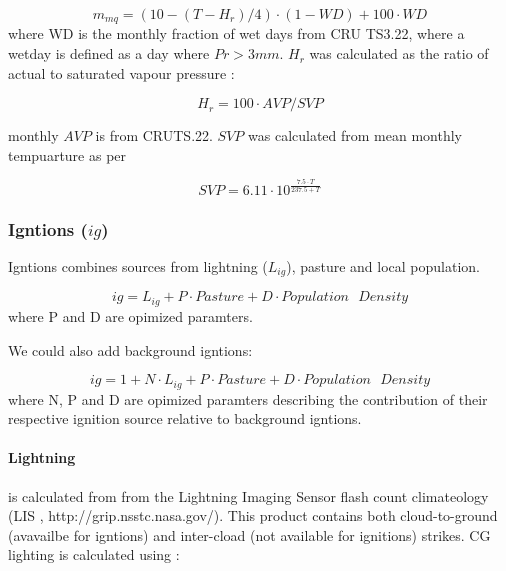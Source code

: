\begin{equation}
     m_{mq}=
        (10 - (T - H_r) / 4) \cdot (1 - WD)
        + 100 \cdot WD
\end{equation}
where WD is the monthly fraction of wet days from CRU TS3.22, where a wetday is defined as a day where $Pr > 3mm$. $H_r$ was calculated as the ratio of actual to saturated vapour pressure :

\begin{equation}
    H_r = 100 \cdot AVP / SVP
\end{equation}

monthly $AVP$ is from CRUTS.22. $SVP$ was calculated from mean monthly tempuarture as per \citet{walter2000asce}

\begin{equation}
    SVP = 6.11 \cdot 10^{\frac{7.5 \cdot T}{237.5 + T}}
\end{equation}

\subsubsection{Igntions ($ig$)}

Igntions combines sources from lightning ($L_{ig}$), pasture and local population.

\begin{equation}
    ig = L_{ig} + P \cdot Pasture + D \cdot Population\text{ }Density
\end{equation}
where P and D are opimized paramters.

\begin{shaded}
    We could also add background igntions:

    \begin{equation}
        ig = 1 + N \cdot L_{ig} + P \cdot Pasture + D \cdot Population\text{ }Density
    \end{equation}
    where N, P and D are opimized paramters describing the contribution of their respective ignition source relative to background igntions.
\end{shaded}

\paragraph{Lightning}
is calculated from
from the Lightning Imaging Sensor flash count climateology (LIS \cite{christian1999lightning}, http://grip.nsstc.nasa.gov/). 
This product contains both cloud-to-ground (avavailbe for igntions) and inter-cload (not available for ignitions) strikes.
CG lighting is calculated using \citet{kelley2014improved}:

